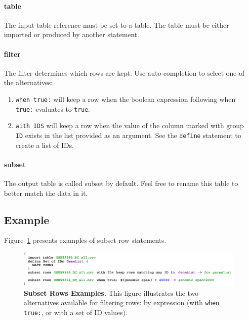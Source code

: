 \paragraph{table}
The input table reference must be set to a table. The table must be either imported or produced by another statement.
\paragraph{filter}
The filter determines which rows are kept. Use auto-completion to select one of the alternatives:
\begin{enumerate}
	\item \texttt{when true:} will keep a row when the boolean expression following when \texttt{true:} evaluates to  \texttt{true}.
	\item \texttt{with IDS} will keep a row when the value of the column marked with group \texttt{ID} exists in the list provided as an argument. See the \texttt{define} statement to create a list of IDs. 
\end{enumerate}

\paragraph{subset}
The output table is called subset by default. Feel free to rename this table to better match the data in it.

\subsection{Example}
Figure~\ref{fig:ExampleSubsetRows} presents examples of subset row statements. 

\begin{figure}[h!tbp]
  \centering
  \includegraphics[width=\figWidthWide]{figures/ExampleSubsetRows.pdf}
\caption[Subset Rows Examples.]{\textbf{Subset Rows Examples.} This figure illustrates the two alternatives available for filtering rows: by expression (with \texttt{when true:}, or with a set of ID values).}
\label{fig:ExampleSubsetRows}
\end{figure}

